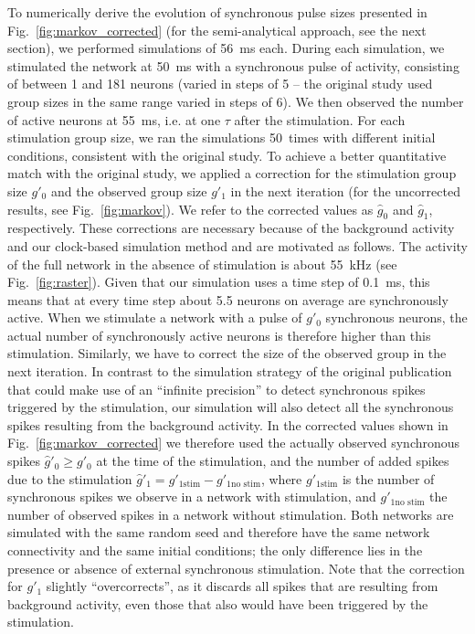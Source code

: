 \documentclass[10pt,a4paper,onecolumn]{article}
\begin{document}
To numerically derive the evolution of synchronous pulse sizes presented in Fig.~\ref{fig:markov_corrected} (for the semi-analytical approach, see the next section), we performed simulations of \SI{56}{\milli\second} each. During each simulation, we stimulated the network at \SI{50}{\milli\second} with a synchronous pulse of activity, consisting of between 1 and 181 neurons (varied in steps of 5 -- the original study used group sizes in the same range varied in steps of 6). We then observed the number of active neurons at \SI{55}{\milli\second}, i.e. at one $\tau$ after the stimulation. For each stimulation group size, we ran the simulations 50~times with different initial conditions, consistent with the original study. To achieve a better quantitative match with the original study, we applied a correction for the stimulation group size $g'_0$ and the observed group size $g'_1$ in the next iteration (for the uncorrected results, see Fig.~\ref{fig:markov}). We refer to the corrected values as $\hat{g}_0$ and $\hat{g}_1$, respectively. These corrections are necessary because of the background activity and our clock-based simulation method and are motivated as follows.  The activity of the full network in the absence of stimulation is about \SI{55}{\kilo\hertz} (see Fig.~\ref{fig:raster}). Given that our simulation uses a time step of \SI{0.1}{\milli\second}, this means that at every time step about 5.5 neurons on average are synchronously active. When we stimulate a network with a pulse of $g'_0$ synchronous neurons, the actual number of synchronously active neurons is therefore higher than this stimulation. Similarly, we have to correct the size of the observed group in the next iteration. In contrast to the simulation strategy of the original publication that could make use of an ``infinite precision'' to detect synchronous spikes triggered by the stimulation, our simulation will also detect all the synchronous spikes resulting from the background activity. In the corrected values shown in Fig.~\ref{fig:markov_corrected} we therefore used the actually observed synchronous spikes $\hat{g}'_0 \geq g'_0$ at the time of the stimulation, and the number of added spikes due to the stimulation $\hat{g}'_1 = g'_{1 \text{stim}} - g'_{1 \text{no stim}}$, where $g'_{1 \text{stim}}$ is the number of synchronous spikes we observe in a network with stimulation, and $g'_{1 \text{no stim}}$ the number of observed spikes in a network without stimulation. Both networks are simulated with the same random seed and therefore have the same network connectivity and the same initial conditions; the only difference lies in the presence or absence of external synchronous stimulation. Note that the correction for $g'_1$ slightly ``overcorrects'', as it discards all spikes that are resulting from background activity, even those that also would have been triggered by the stimulation.
\end{document}
